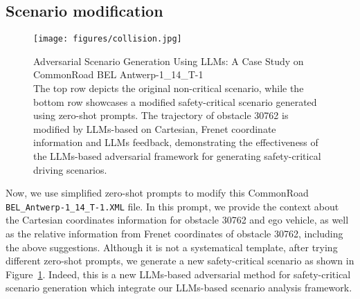 \subsection{Scenario modification}
\begin{figure}[ht]
    \centering
    \texttt{[image: figures/collision.jpg]} 
        \caption{
        Adversarial Scenario Generation Using LLMs: A Case Study on CommonRoad BEL Antwerp-1\_14\_T-1\\
        The top row depicts the original non-critical scenario, while the bottom row showcases a modified safety-critical scenario generated using zero-shot prompts. The trajectory of obstacle 30762 is modified by LLMs-based on Cartesian, Frenet coordinate information and LLMs feedback, demonstrating the effectiveness of the LLMs-based adversarial framework for generating safety-critical driving scenarios.
    }
    \label{fig:collison} %
\end{figure}
Now, we use simplified zero-shot prompts to modify this CommonRoad \texttt{BEL\_Antwerp-1\_14\_T-1.XML} file. In this prompt, we provide the context about the Cartesian coordinates information for obstacle 30762 and ego vehicle, as well as the relative information from Frenet coordinates of obstacle 30762, including the above suggestions. Although it is not a systematical template, after trying different zero-shot prompts, we generate a new safety-critical scenario as shown in Figure~\ref{fig:collison}. Indeed, this is a new LLMs-based adversarial method for safety-critical scenario generation which integrate our LLMs-based scenario analysis framework.


